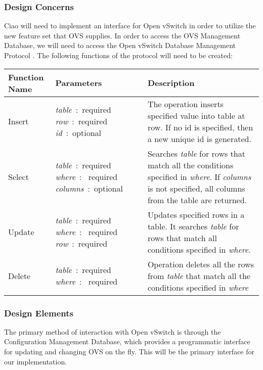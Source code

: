 \documentclass[10pt,onecolumn,journal,draftclsnofoot]{IEEEtran}
\begin{document}
\subsubsection{Design Concerns}
Ciao will need to implement an interface for Open vSwitch in order to utilize
the new feature set that OVS supplies. In order to access the OVS Management
Database, we will need to access the Open vSwitch Database Management Protocol
\cite{rfc7047}. The following functions of the protocol will need to be created:
\cite{rfc7047}\\

\begin{center}
	\begin{tabular}{| p{3cm} | p{4cm} | p{6cm} |}
		\hline
		Function Name & Parameters & Description \\ \hline
		Insert & \textit{table}~:~required \newline
		\textit{row}~:~required \newline \textit{id}~:~optional &
		The operation inserts specified value into
		table at row. If no id is specified, then a new unique
		id is generated.\\ \hline
		Select & \textit{table}~:~required \newline \textit{where}~:~
		required \newline \textit{columns}~:~optional & Searches
		\textit{table} for rows that match all the conditions specified
		in \textit{where}. If \textit{columns} is not specified, all
		columns from the table are returned.\\ \hline
		Update & \textit{table}~:~required \newline \textit{where}~:~
		required \newline \textit{row}~:~required & Updates specified
		rows in a table. It searches \textit{table} for rows that match
		all conditions specified in \textit{where}.\\ \hline
		Delete & \textit{table}~:~required \newline \textit{where}~:~
		required & Operation deletes all the rows from \textit{table}
		that match all the conditions specified in \textit{where} \\ \hline
	\end{tabular}
\end{center}

\subsubsection{Design Elements}
The primary method of interaction with Open vSwitch is through the Configuration
Management Database, which provides a programmatic interface for updating and
changing OVS on the fly. This will be the primary interface for our
implementation.
\end{document}
